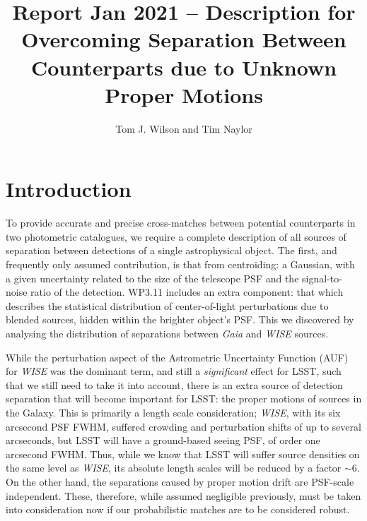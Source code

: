 \documentclass[fleqn,usenatbib]{mnras}
\title[]{Report Jan 2021 – Description for Overcoming Separation Between Counterparts due to Unknown Proper Motions}
\author[Tom J. Wilson and Tim Naylor]{
Tom J. Wilson
and Tim Naylor
\\
}
\date{}
\begin{document}
\label{firstpage}
\pagerange{\pageref{firstpage}--\pageref{lastpage}}
\maketitle
\begin{abstract}

\end{abstract}

\section{Introduction}

To provide accurate and precise cross-matches between potential counterparts in two photometric catalogues, we require a complete description of all sources of separation between detections of a single astrophysical object. The first, and frequently only assumed contribution, is that from centroiding: a Gaussian, with a given uncertainty related to the size of the telescope PSF and the signal-to-noise ratio of the detection. WP3.11 includes an extra component: that which describes the statistical distribution of center-of-light perturbations due to blended sources, hidden within the brighter object's PSF. This we discovered by analysing the distribution of separations between \textit{Gaia} and \textit{WISE} sources.

While the perturbation aspect of the Astrometric Uncertainty Function (AUF) for \textit{WISE} was the dominant term, and still a \textit{significant} effect for LSST, such that we still need to take it into account, there is an extra source of detection separation that will become important for LSST: the proper motions of sources in the Galaxy. This is primarily a length scale consideration; \textit{WISE}, with its six arcsecond PSF FWHM, suffered crowding and perturbation shifts of up to several arcseconds, but LSST will have a ground-based seeing PSF, of order one arcsecond FWHM. Thus, while we know that LSST will suffer source densities on the same level as \textit{WISE}, its absolute length scales will be reduced by a factor $\sim$6. On the other hand, the separations caused by proper motion drift are PSF-scale independent. These, therefore, while assumed negligible previously, must be taken into consideration now if our probabilistic matches are to be considered robust.
\end{document}
